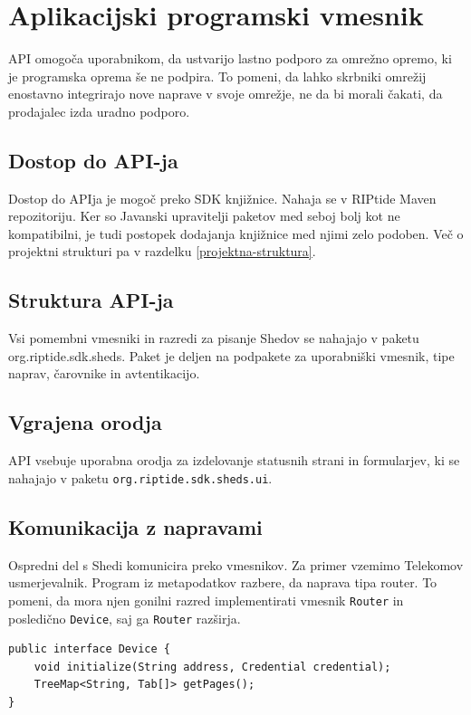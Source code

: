 \documentclass[12pt]{article}
\begin{document}
\section{Aplikacijski programski vmesnik}
API omogoča uporabnikom, da ustvarijo lastno podporo za omrežno
opremo, ki je programska oprema še ne podpira. To pomeni, da lahko
skrbniki omrežij enostavno integrirajo nove naprave v svoje omrežje, ne da
bi morali čakati, da prodajalec izda uradno podporo.

\subsection{Dostop do API-ja}
Dostop do APIja je mogoč preko SDK knjižnice. Nahaja se v RIPtide
Maven repozitoriju. Ker so Javanski upravitelji paketov med seboj bolj
kot ne kompatibilni, je tudi postopek dodajanja knjižnice med njimi
zelo podoben. Več o projektni strukturi pa v razdelku
\ref{projektna-struktura}.

\subsection{Struktura API-ja}
Vsi pomembni vmesniki in razredi za pisanje Shedov se
nahajajo v paketu org.riptide.sdk.sheds. Paket je deljen na
podpakete za uporabniški vmesnik, tipe naprav, čarovnike in
avtentikacijo.

\subsection{Vgrajena orodja}
API vsebuje uporabna orodja za izdelovanje statusnih strani in
formularjev, ki se nahajajo v paketu \verb|org.riptide.sdk.sheds.ui|.

\subsection{Komunikacija z napravami} \label{komunikacija-z-napravami}
Ospredni del s Shedi komunicira preko vmesnikov. Za primer vzemimo
Telekomov usmerjevalnik. Program iz metapodatkov razbere, da
naprava tipa router. To pomeni, da mora njen gonilni razred
implementirati vmesnik \verb|Router| in posledično \verb|Device|,
saj ga \verb|Router| razširja.

\begin{lstlisting}
public interface Device {
	void initialize(String address, Credential credential);
	TreeMap<String, Tab[]> getPages();
}
\end{lstlisting}
\end{document}
